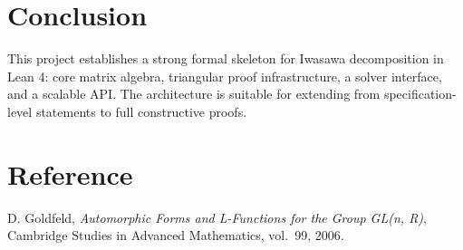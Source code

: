 \documentclass[11pt]{article}
\begin{document}
\section{Conclusion}
This project establishes a strong formal skeleton for Iwasawa decomposition in Lean 4:
core matrix algebra, triangular proof infrastructure, a solver interface, and a scalable API.
The architecture is suitable for extending from specification-level statements to full constructive proofs.

\section*{Reference}
D. Goldfeld, \emph{Automorphic Forms and L-Functions for the Group GL(n, R)},
Cambridge Studies in Advanced Mathematics, vol.~99, 2006.
\end{document}
